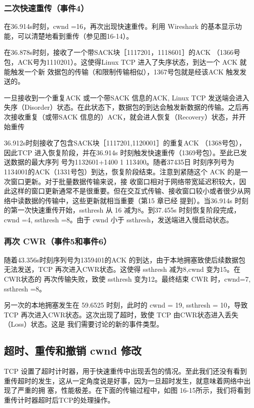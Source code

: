 \subsubsection{二次快速重传（事件4）}
在36.914s时刻，cwnd =16，再次出现快速重传。利用 Wireshark 的基本显示功能，可以清楚地看到重传（参见图16-14）。

在36.878s时刻，接收了一个带SACK块［1117201，1118601］的ACK （1366号包，ACK号为1110201）。这使得Linux TCP 进入了失序状态，到达一个 ACK 就能触发一个新
效据包的传输（和限制传输相似），1367号包就是经该ACK 触发发送的。

一旦接收到一个重复ACK 或一个带SACK 信息的ACK, Linux TCP 发送端会进入失序（Disorder）状态。在此状态下，数据包的到达会触发新数据的传输。之后再次接收重复（或带SACK 信息的）ACK，就会进人恢复（Recovery）状态，并开始重传

36.912s时刻接收了包含SACK块［1117201,1120001］的重复ACK （1368号包），因此TCP 进入恢复阶段，并在36.914s 时刻触发快速重传（1369号包）。至此已发送数据的最大序列
号为1132601+1400 1 113400。随者37435日 时刻序列号为 1134001的ACK（1331号包）到达，恢复阶段结束。注意到紧随这个 ACK 的是一次窗口更新。对于批量数据传输来说，接
收窗口相对于网络带宽延迟积较大，因此这样的窗口更新通常不是很重要。但在交互式传输、接收窗口较小或者很少从网络中读数据的传输中，这些更新就相当重要（第15 章已经
提到）。当36.914s 时刻的第一次快速重传开始，ssthresh 从 16 减为8。到37.455s 时刻恢复阶段完成，cwnd =4, ssthresh =8。由于 cwnd 小于 ssthresh，发送端进入慢启动状态。

\subsubsection{再次 CWR（事件5和事件6）}
随着43.356s时刻序列号为1359401的ACK 的到达，由于本地拥塞致使后续数据包无法发送，TCP 再次进入CWR状态。这使得 ssthresh 减为8,cwnd 变为15。在CWR状态的
再次传输失败，致使 ssthresh 变为12。最终结束 CWR 时，cwnd=7, ssthresh =8。

另一次的本地拥塞发生在 59.6525 时刻，此时的 cwnd = 19, ssthresh = 10，导致 TCP 再次进入CWR状态。这次出现了超时，致使 TCP 由CWR状态进入丢失（Loss）状态。这是
我们需要讨论的新的事件类型。

\subsection{超时、重传和撤销 cwnd 修改}
TCP 设置了超时计时器，用于快速重传中出现丢包的情况。至此我们还没有看到重传超时的发生，这从一定角度说是好事，因为一旦超时发生，就意味着网络中出现了严重的拥
塞，性能极差。在下面的传输过程中，如图 16-15所示，我们将看到重传计时器超时后TCP的处理操作。


